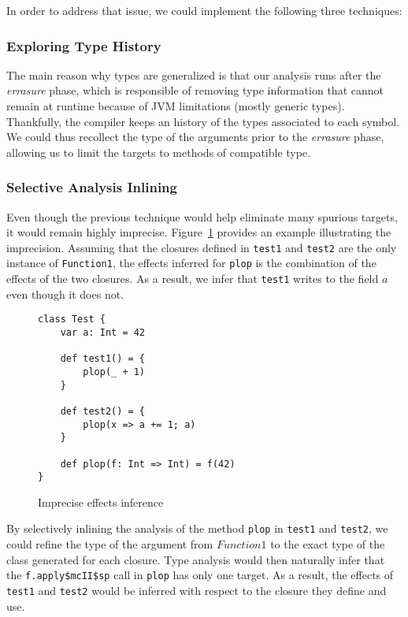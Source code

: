 In order to address that issue, we could implement the following three
techniques:

\subsubsection{Exploring Type History}
The main reason why types are generalized is that our analysis runs
after the \emph{errasure} phase, which is responsible of removing type
information that cannot remain at runtime because of JVM limitations (mostly
generic types). Thankfully, the compiler keeps an history of the types
associated to each symbol. We could thus recollect the type of the arguments
prior to the \emph{errasure} phase, allowing us to limit the targets to methods
of compatible type.

\subsubsection{Selective Analysis Inlining}
Even though the previous technique would help eliminate many spurious targets,
it would remain highly imprecise. Figure~\ref{fig:con:inl} provides an example
illustrating the imprecision. Assuming that the closures defined in
\lstinline{test1} and \lstinline{test2} are the only instance of
\lstinline{Function1}, the effects inferred for \lstinline{plop} is the
combination of the effects of the two closures. As a result, we infer that
\lstinline{test1} writes to the field $a$ even though it does not.

\begin{figure}[h]
    \centering
\begin{lstlisting}
class Test {
    var a: Int = 42

    def test1() = {
        plop(_ + 1)
    }

    def test2() = {
        plop(x => a += 1; a)
    }

    def plop(f: Int => Int) = f(42)
}
\end{lstlisting}
    \caption{Imprecise effects inference}
    \label{fig:con:inl}
\end{figure}

By selectively inlining the analysis of the method \lstinline{plop} in
\lstinline{test1} and \lstinline{test2}, we could refine the type of the
argument from $Function1$ to the exact type of the class generated for each
closure. Type analysis would then naturally infer that the
\lstinline{f.apply$mcII$sp} call in \lstinline{plop} has only one target.  As a
result, the effects of \lstinline{test1} and \lstinline{test2} would be
inferred with respect to the closure they define and use.

